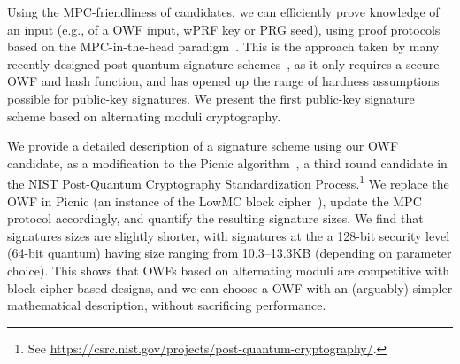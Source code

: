 Using the MPC-friendliness of candidates, we can efficiently prove knowledge of
an input (e.g., of a OWF input, wPRF key or PRG seed), using proof protocols
based on the MPC-in-the-head paradigm~\cite{ishai2007-zkmpc}.  This is the approach
taken by many recently designed post-quantum signature
schemes~\cite{chase2017-picnic,katz2018-pqsigs,beullens2020-sigma-mq,beullens2020-legroast,guilhem2019-bbq,banquet},
as it only requires a secure OWF and hash function, and has opened up the range
of hardness assumptions possible for public-key signatures.  We present the
first public-key signature scheme based on alternating moduli cryptography. 

We provide a detailed description of a signature scheme using our OWF candidate,
as a modification to the Picnic
algorithm~\cite{chase2017-picnic,katz2018-pqsigs,kales2020-picnic,picnic-spec}, a
third round candidate in the NIST Post-Quantum Cryptography Standardization
Process.\footnote{See
\url{https://csrc.nist.gov/projects/post-quantum-cryptography/}.} We replace
the OWF in Picnic (an instance of the LowMC block cipher~\cite{albrecht2015-lowmc}),
update the MPC protocol accordingly, and quantify the resulting signature
sizes.  We find that signatures sizes are slightly shorter, with signatures at
the a 128-bit security level (64-bit quantum) having size ranging from 10.3--13.3KB (depending
on parameter choice).  This
shows that OWFs based on alternating moduli are competitive with block-cipher
based designs, and we can choose a OWF with an (arguably) simpler mathematical
description, without sacrificing performance. 

\newpage
